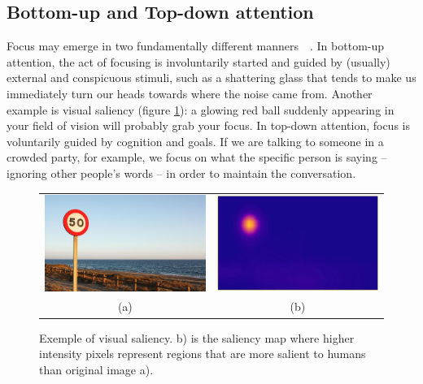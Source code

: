 \documentclass[English]{style/ic-tese-v3}
\begin{document}
\subsection{Bottom-up and Top-down attention}
Focus may emerge in two fundamentally different manners~\cite{ref:esther-thesis}~\cite{ref:vocus}.
In bottom-up attention, the act of focusing is involuntarily
started and guided by (usually) external and conspicuous stimuli,
such as a shattering glass that tends to
make us immediately turn our heads towards where the noise came from.
Another example is visual saliency (figure \ref{fig:saliency}):
a glowing red ball suddenly appearing in
your field of vision will probably grab your focus.
In top-down attention, focus is voluntarily guided by cognition and goals.
If we are talking to someone in a crowded party, for example,
we focus on what the specific person is saying
-- ignoring other people's words -- in order to maintain the conversation.

\begin{figure}
\begin{center}
		\begin{tabular} {cc}
		\includegraphics[width=0.45\linewidth]{./img/traffic_sign_s.jpg} &
		\includegraphics[width=0.45\linewidth]{./img/traffic_sign_m.jpg}\\
        (a) & (b)
		\end{tabular}
\caption{Exemple of visual saliency.
    b) is the saliency map where higher intensity pixels represent
    regions that are more salient to humans than original image a).}
\label{fig:saliency}
\end{center}
\end{figure}
\end{document}
